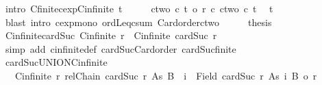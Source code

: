 \begin{isabellebody}
\ {\isacharparenleft}{\kern0pt}intro\ Cfinite{\isacharunderscore}{\kern0pt}cexp{\isacharunderscore}{\kern0pt}Cinfinite\ t{\isacharparenright}{\kern0pt}\isanewline
\ \ \isamarkupfalse%
\ \isamarkupfalse%
\ {\isachardoublequoteopen}ctwo\ {\isacharcircum}{\kern0pt}c\ t\ {\isasymle}o\ {\isacharparenleft}{\kern0pt}r\ {\isacharplus}{\kern0pt}c\ ctwo{\isacharparenright}{\kern0pt}\ {\isacharcircum}{\kern0pt}c\ t{\isachardoublequoteclose}\ \isamarkupfalse%
\ t\isanewline
\ \ \ \ \isamarkupfalse%
\ {\isacharparenleft}{\kern0pt}blast\ intro{\isacharcolon}{\kern0pt}\ cexp{\isacharunderscore}{\kern0pt}mono{}\ ordLeq{\isacharunderscore}{\kern0pt}csum{}\ Card{\isacharunderscore}{\kern0pt}order{\isacharunderscore}{\kern0pt}ctwo{\isacharparenright}{\kern0pt}\isanewline
\ \ \isamarkupfalse%
\ \isamarkupfalse%
\ {\isacharquery}{\kern0pt}thesis\ \isacommand{{\isachardot}{\kern0pt}}\isamarkupfalse%
\isanewline
{}\isamarkupfalse%
%
\endisatagproof
{\isafoldproof}%
%
\isadelimproof
\isanewline
%
\endisadelimproof
\isanewline
\isanewline
\isanewline
{}\isamarkupfalse%
\ Cinfinite{\isacharunderscore}{\kern0pt}cardSuc{\isacharcolon}{\kern0pt}\ {\isachardoublequoteopen}Cinfinite\ r\ {\isasymLongrightarrow}\ Cinfinite\ {\isacharparenleft}{\kern0pt}cardSuc\ r{\isacharparenright}{\kern0pt}{\isachardoublequoteclose}\isanewline
%
\isadelimproof
%
\endisadelimproof
%
\isatagproof
{}\isamarkupfalse%
\ {\isacharparenleft}{\kern0pt}simp\ add{\isacharcolon}{\kern0pt}\ cinfinite{\isacharunderscore}{\kern0pt}def\ cardSuc{\isacharunderscore}{\kern0pt}Card{\isacharunderscore}{\kern0pt}order\ cardSuc{\isacharunderscore}{\kern0pt}finite{\isacharparenright}{\kern0pt}%
\endisatagproof
{\isafoldproof}%
%
\isadelimproof
\isanewline
%
\endisadelimproof
\isanewline
{}\isamarkupfalse%
\ cardSuc{\isacharunderscore}{\kern0pt}UNION{\isacharunderscore}{\kern0pt}Cinfinite{\isacharcolon}{\kern0pt}\isanewline
\ \ \ {\isachardoublequoteopen}Cinfinite\ r{\isachardoublequoteclose}\ {\isachardoublequoteopen}relChain\ {\isacharparenleft}{\kern0pt}cardSuc\ r{\isacharparenright}{\kern0pt}\ As{\isachardoublequoteclose}\ {\isachardoublequoteopen}B\ {\isasymle}\ {\isacharparenleft}{\kern0pt}{\isasymUnion}i\ {\isasymin}\ Field\ {\isacharparenleft}{\kern0pt}cardSuc\ r{\isacharparenright}{\kern0pt}{\isachardot}{\kern0pt}\ As\ i{\isacharparenright}{\kern0pt}{\isachardoublequoteclose}\ {\isachardoublequoteopen}{\isacharbar}{\kern0pt}B{\isacharbar}{\kern0pt}\ {\isacharless}{\kern0pt}{\isacharequal}{\kern0pt}o\ r{\isachardoublequoteclose}\isanewline

\end{isabellebody}
